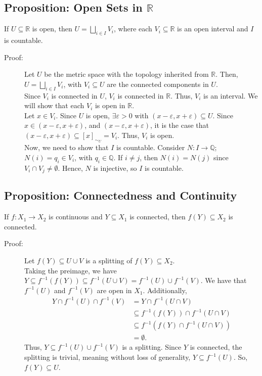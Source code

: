 \documentclass[10pt]{extarticle}
\newcommand{\Q}{\mathbb{Q}}
\newcommand{\R}{\mathbb{R}}
\begin{document}
  \subsection{Proposition: Open Sets in $\R$}%
  If $U\subseteq \R$ is open, then $U = \bigsqcup_{i\in I}V_i$, where each $V_i\subseteq \R$ is an open interval and $I$ is countable.
  \begin{description}
    \item[Proof:] Let $U$ be the metric space with the topology inherited from $\R$. Then, $U = \bigsqcup_{i\in I}V_i$, with $V_i \subseteq U$ are the connected components in $U$.\\

      Since $V_i$ is connected in $U$, $V_i$ is connected in $\R$. Thus, $V_i$ is an interval. We will show that each $V_i$ is open in $\R$.\\

      Let $x\in V_i$. Since $U$ is open, $\exists \varepsilon > 0$ with $(x-\varepsilon,x+\varepsilon)\subseteq U$. Since $x\in (x-\varepsilon,x+\varepsilon)$, and $(x-\varepsilon,x+\varepsilon)$, it is the case that $(x-\varepsilon,x+\varepsilon)\subseteq [x]_{\sim_U} = V_i$. Thus, $V_i$ is open.\\

      Now, we need to show that $I$ is countable. Consider $N: I\rightarrow \Q$; $N(i) = q_i\in V_i$, with $q_i\in \Q$. If $i\neq j$, then $N(i) = N(j)$ since $V_i\cap V_j \neq \emptyset$. Hence, $N$ is injective, so $I$ is countable.
  \end{description}
  \subsection{Proposition: Connectedness and Continuity}%
  If $f: X_1\rightarrow X_2$ is continuous and $Y\subseteq X_1$ is connected, then $f(Y)\subseteq X_2$ is connected.
  \begin{description}
    \item[Proof:] Let $f(Y)\subseteq U\cup V$ is a splitting of $f(Y)\subseteq X_2$.\\

      Taking the preimage, we have $Y\subseteq f^{-1}(f(Y))\subseteq f^{-1}(U\cup V) = f^{-1}(U)\cup f^{-1}(V)$. We have that $f^{-1}(U)$ and $f^{-1}(V)$ are open in $X_1$. Additionally,
      \begin{align*}
        Y\cap f^{-1}(U)\cap f^{-1}(V) &= Y\cap f^{-1}(U\cap V)\\
                                      &\subseteq f^{-1}\left(f(Y)\right)\cap f^{-1}(U\cap V)\\
                                      &\subseteq f^{-1}\left(f(Y)\cap f^{-1}(U\cap V)\right)\\
                                      &= \emptyset.
      \end{align*}
      Thus, $Y\subseteq f^{-1}(U)\cup f^{-1}(V)$ is a splitting. Since $Y$ is connected, the splitting is trivial, meaning without loss of generality, $Y\subseteq f^{-1}(U)$. So, $f(Y)\subseteq U$.
  \end{description}
\end{document}

